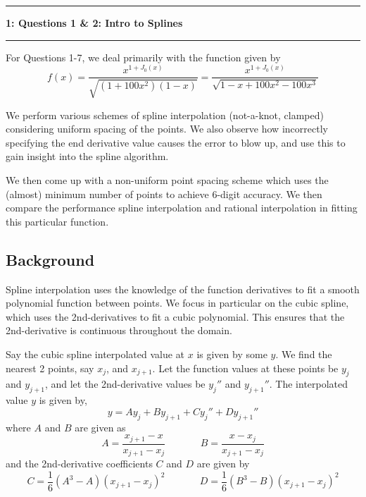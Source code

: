 \documentclass[11pt]{article}
\newcommand\question[2]{\vspace{.25in}\hrule\textbf{#1: #2}\vspace{.5em}\hrule\vspace{.10in}}
\begin{document}
\raggedright
\newcommand\NAME{Surajkumar H}  %
\newcommand\ANDREWID{EE11B075}     %
\newcommand\HWNUM{2}              %


\question{1}{Questions 1 \& 2: Intro to Splines} 
\setcounter{section}{1}
For Questions 1-7, we deal primarily with the function given by 
\begin{equation}
f(x) = \frac{x^{1+J_0(x)}}{\sqrt{(1+100x^2)(1-x)}} = \frac{x^{1+J_0(x)}}{\sqrt{1-x+100x^2-100x^3}} 
\label{func}
\end{equation}

We perform various schemes of spline interpolation (not-a-knot, clamped) considering uniform spacing of the points. We also observe how incorrectly specifying the end derivative value  causes the error to blow up, and use this to gain insight into the spline algorithm.

We then come up with a non-uniform point spacing scheme which uses the (almost) minimum number of points to achieve 6-digit accuracy. We then compare the performance spline interpolation and rational interpolation in fitting this particular function.



\subsection{Background}

Spline interpolation uses the knowledge of the function derivatives to fit a smooth polynomial function between points. We focus in particular on the cubic spline, which uses the 2nd-derivatives to fit a cubic polynomial. This ensures that the 2nd-derivative is continuous throughout the domain. 


Say the cubic spline interpolated value at $x$ is given by some $y$. We find the nearest 2 points, say $x_{j}$, and $x_{j+1}$. Let the function values at these points be $y_{j}$ and $y_{j+1}$, and let the 2nd-derivative values be $y_{j}''$ and $y_{j+1}''$. The interpolated value $y$ is given by,
\begin{equation}
y=Ay_{j}+By_{j+1}+Cy_{j}''+Dy_{j+1}''
\end{equation}
where $A$ and $B$ are given as 
\begin{equation}
A=\frac{x_{j+1}-x}{x_{j+1}-x_{j}} \:\:\:\:\:\:\:\:\:\:\:\:\:\:\:\: B=\frac{x-x_{j}}{x_{j+1}-x_{j}}
\end{equation}
and the 2nd-derivative coefficients $C$ and $D$ are given by
\begin{equation}
C=\frac{1}{6}(A^3-A)(x_{j+1}-x_{j})^2 \:\:\:\:\:\:\:\:\:\:\:\:\:\:\:\: D=\frac{1}{6}(B^3-B)(x_{j+1}-x_{j})^2
\end{equation}
\end{document}
